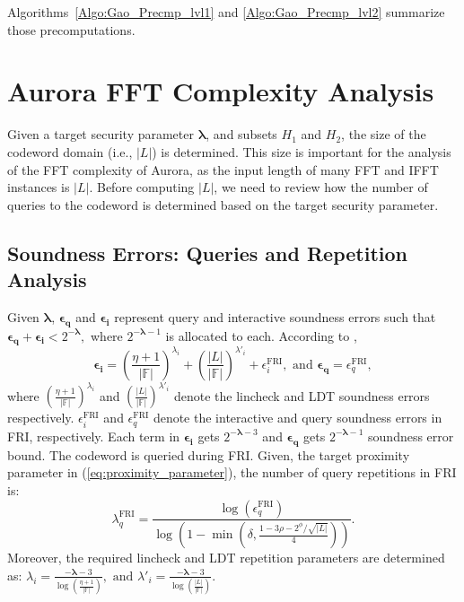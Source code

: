 Algorithms~\ref{Algo:Gao_Precmp_lvl1} and \ref{Algo:Gao_Precmp_lvl2} summarize those precomputations.


\section{Aurora FFT Complexity Analysis} \label{Sec:FFT_Calls_in_Aurora}
Given a target security parameter $\boldsymbol{\lambda}$, and subsets $H_1$ and $H_2$,
the size of the codeword domain (i.e., $|L|$) is determined. This size is important for the analysis of the FFT complexity of Aurora, as the input length of many FFT and IFFT instances is $|L|$. Before computing $|L|$, we need to review how the number of queries to the  codeword is determined based on the target security parameter.

\subsection{Soundness Errors: Queries and Repetition Analysis}
Given $\boldsymbol{\lambda}$, $\boldsymbol{\epsilon_q}$ and $\boldsymbol{\epsilon_i}$ represent query and interactive soundness errors such that
\(
\boldsymbol{\epsilon_q} + \boldsymbol{\epsilon_i} < 2^{-\boldsymbol{\lambda}},
\)
where $2^{-\boldsymbol{\lambda} - 1}$ is allocated to each. According to \cite[Theorem 4]{Aurora2019}, 
\[
\boldsymbol{\epsilon_i} = \left(\frac{\eta + 1}{|\mathbb{F}|}\right)^{\lambda_i} + \left(\frac{|L|}{|\mathbb{F}|}\right)^{\lambda'_i} + \epsilon^{\text{FRI}}_i,\text{ and } \boldsymbol{\epsilon_q} = \epsilon^{\text{FRI}}_q,
\]
where $ \left(\frac{\eta + 1}{|\mathbb{F}|}\right)^{\lambda_i}$ and $\left(\frac{|L|}{|\mathbb{F}|}\right)^{\lambda'_i}$ denote the lincheck and LDT soundness errors respectively. $\epsilon^{\text{FRI}}_i$ and   $\epsilon^{\text{FRI}}_q$ denote the interactive and query soundness errors in FRI, respectively. Each term in $\boldsymbol{\epsilon_i}$ gets $2^{-\boldsymbol{\lambda} - 3}$ and $\boldsymbol{\epsilon_q}$ gets $2^{-\boldsymbol{\lambda} - 1}$ soundness error bound. 
The codeword is queried during FRI. 
Given, the target proximity parameter in (\ref{eq:proximity_parameter}), the number of query repetitions in FRI is:
\begin{equation}\label{eq:num_queries}
	\lambda_q^\text{FRI} = \frac{\log(\epsilon^{\text{FRI}}_q)}{\log\left( 1 - \min\left(\delta,  \frac{1- 3\rho - 2^\phi/\sqrt{|L|}}{4} \right)  \right)}.  
\end{equation}
Moreover, the required lincheck and LDT repetition parameters are determined as:
\(
\lambda_i = \frac{-\boldsymbol{\lambda} - 3}{\log\left(\frac{\eta+1}{|\mathbb{F}|}\right)},\text{ and } \lambda'_i = \frac{-\boldsymbol{\lambda} - 3}{\log\left(\frac{|L|}{|\mathbb{F}|}\right)}.
\)



